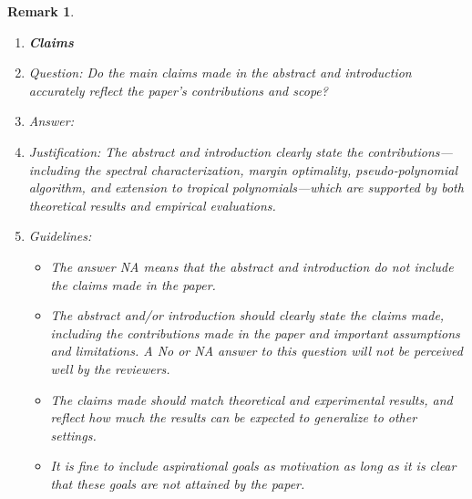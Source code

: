 \documentclass{article}
\newtheorem{remark}{Remark}
\begin{document}
\begin{remark}
\begin{enumerate}
\item {\bf Claims}
    \item[] Question: Do the main claims made in the abstract and introduction accurately reflect the paper's contributions and scope?
    \item[] Answer: \answerYes{}
    \item[] Justification: The abstract and introduction clearly state the contributions—including the spectral characterization, margin optimality, pseudo‐polynomial algorithm, and extension to tropical polynomials—which are supported by both theoretical results and empirical evaluations.
    \item[] Guidelines:
    \begin{itemize}
        \item The answer NA means that the abstract and introduction do not include the claims made in the paper.
        \item The abstract and/or introduction should clearly state the claims made, including the contributions made in the paper and important assumptions and limitations. A No or NA answer to this question will not be perceived well by the reviewers. 
        \item The claims made should match theoretical and experimental results, and reflect how much the results can be expected to generalize to other settings. 
        \item It is fine to include aspirational goals as motivation as long as it is clear that these goals are not attained by the paper. 
    \end{itemize}


\end{enumerate}
\end{remark}
\end{document}
